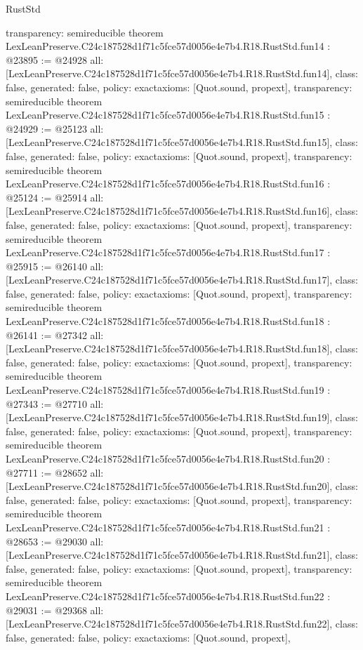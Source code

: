 \begin{lexlean}{RustStd}
\begin{coremodule}
{  transparency: semireducible
}
theorem LexLeanPreserve.C24c187528d1f71c5fce57d0056e4e7b4.R18.RustStd.fun14 : @23895 := @24928 {
  all: [LexLeanPreserve.C24c187528d1f71c5fce57d0056e4e7b4.R18.RustStd.fun14],
  class: false,
  generated: false,
  policy: exact{axioms: [Quot.sound, propext]},
  transparency: semireducible
}
theorem LexLeanPreserve.C24c187528d1f71c5fce57d0056e4e7b4.R18.RustStd.fun15 : @24929 := @25123 {
  all: [LexLeanPreserve.C24c187528d1f71c5fce57d0056e4e7b4.R18.RustStd.fun15],
  class: false,
  generated: false,
  policy: exact{axioms: [Quot.sound, propext]},
  transparency: semireducible
}
theorem LexLeanPreserve.C24c187528d1f71c5fce57d0056e4e7b4.R18.RustStd.fun16 : @25124 := @25914 {
  all: [LexLeanPreserve.C24c187528d1f71c5fce57d0056e4e7b4.R18.RustStd.fun16],
  class: false,
  generated: false,
  policy: exact{axioms: [Quot.sound, propext]},
  transparency: semireducible
}
theorem LexLeanPreserve.C24c187528d1f71c5fce57d0056e4e7b4.R18.RustStd.fun17 : @25915 := @26140 {
  all: [LexLeanPreserve.C24c187528d1f71c5fce57d0056e4e7b4.R18.RustStd.fun17],
  class: false,
  generated: false,
  policy: exact{axioms: [Quot.sound, propext]},
  transparency: semireducible
}
theorem LexLeanPreserve.C24c187528d1f71c5fce57d0056e4e7b4.R18.RustStd.fun18 : @26141 := @27342 {
  all: [LexLeanPreserve.C24c187528d1f71c5fce57d0056e4e7b4.R18.RustStd.fun18],
  class: false,
  generated: false,
  policy: exact{axioms: [Quot.sound, propext]},
  transparency: semireducible
}
theorem LexLeanPreserve.C24c187528d1f71c5fce57d0056e4e7b4.R18.RustStd.fun19 : @27343 := @27710 {
  all: [LexLeanPreserve.C24c187528d1f71c5fce57d0056e4e7b4.R18.RustStd.fun19],
  class: false,
  generated: false,
  policy: exact{axioms: [Quot.sound, propext]},
  transparency: semireducible
}
theorem LexLeanPreserve.C24c187528d1f71c5fce57d0056e4e7b4.R18.RustStd.fun20 : @27711 := @28652 {
  all: [LexLeanPreserve.C24c187528d1f71c5fce57d0056e4e7b4.R18.RustStd.fun20],
  class: false,
  generated: false,
  policy: exact{axioms: [Quot.sound, propext]},
  transparency: semireducible
}
theorem LexLeanPreserve.C24c187528d1f71c5fce57d0056e4e7b4.R18.RustStd.fun21 : @28653 := @29030 {
  all: [LexLeanPreserve.C24c187528d1f71c5fce57d0056e4e7b4.R18.RustStd.fun21],
  class: false,
  generated: false,
  policy: exact{axioms: [Quot.sound, propext]},
  transparency: semireducible
}
theorem LexLeanPreserve.C24c187528d1f71c5fce57d0056e4e7b4.R18.RustStd.fun22 : @29031 := @29368 {
  all: [LexLeanPreserve.C24c187528d1f71c5fce57d0056e4e7b4.R18.RustStd.fun22],
  class: false,
  generated: false,
  policy: exact{axioms: [Quot.sound, propext]},
}
\end{coremodule}
\end{lexlean}
